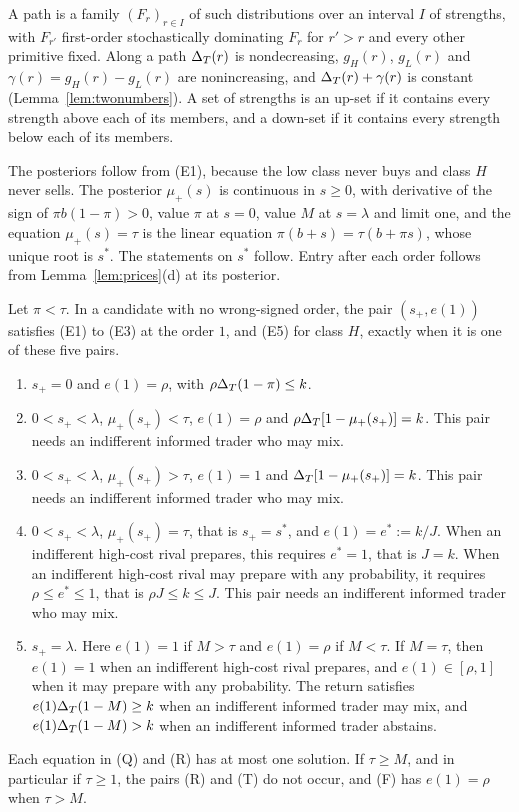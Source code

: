 A path is a family \((F_r)_{r\in I}\) of such distributions over an interval \(I\) of strengths, with \(F_{r'}\) first-order
stochastically dominating \(F_r\) for \(r'>r\) and every other primitive fixed. Along a path \(\Delta_T(r)\) is
nondecreasing, \(g_H(r)\), \(g_L(r)\) and \(\gamma(r)=g_H(r)-g_L(r)\) are nonincreasing, and \(\Delta_T(r)+\gamma(r)\) is
constant (Lemma~\ref{lem:twonumbers}). A set of strengths is an up-set if it contains every strength above each of
its members, and a down-set if it contains every strength below each of its members.

The posteriors follow from (E1), because the low class never buys and class \(H\) never sells. The posterior
\(\mu_+(s)\) is continuous in \(s\ge0\), with derivative of the sign of \(\pi b(1-\pi)>0\), value \(\pi\) at \(s=0\),
value \(M\) at \(s=\lambda\) and limit one, and the equation \(\mu_+(s)=\tau\) is the linear equation
\(\pi(b+s)=\tau(b+\pi s)\), whose unique root is \(s^*\). The statements on \(s^*\) follow. Entry after each order
follows from Lemma~\ref{lem:prices}(d) at its posterior.

\begin{lemma}\label{lem:a4-high}
Let \(\pi<\tau\). In a candidate with no wrong-signed order, the pair \((s_+,e(1))\) satisfies (E1) to (E3) at the
order \(1\), and (E5) for class \(H\), exactly when it is one of these five pairs.
\begin{enumerate}[leftmargin=2.5em]
\item[(N)] \(s_+=0\) and \(e(1)=\rho\), with \(\rho\Delta_T(1-\pi)\le k\).
\item[(Q)] \(0<s_+<\lambda\), \(\mu_+(s_+)<\tau\), \(e(1)=\rho\) and \(\rho\Delta_T[1-\mu_+(s_+)]=k\). This pair needs an
indifferent informed trader who may mix.
\item[(R)] \(0<s_+<\lambda\), \(\mu_+(s_+)>\tau\), \(e(1)=1\) and \(\Delta_T[1-\mu_+(s_+)]=k\). This pair needs an
indifferent informed trader who may mix.
\item[(T)] \(0<s_+<\lambda\), \(\mu_+(s_+)=\tau\), that is \(s_+=s^*\), and \(e(1)=e^*:=k/J\). When an indifferent
high-cost rival prepares, this requires \(e^*=1\), that is \(J=k\). When an indifferent high-cost rival
may prepare with any probability, it requires \(\rho\le e^*\le1\), that is \(\rho J\le k\le J\). This pair needs an
indifferent informed trader who may mix.
\item[(F)] \(s_+=\lambda\). Here \(e(1)=1\) if \(M>\tau\) and \(e(1)=\rho\) if \(M<\tau\). If \(M=\tau\), then \(e(1)=1\)
when an indifferent high-cost rival prepares, and \(e(1)\in[\rho,1]\) when it may prepare with any probability.
The return satisfies \(e(1)\Delta_T(1-M)\ge k\) when an indifferent informed trader may mix, and \(e(1)\Delta_T(1-M)>k\) when an
indifferent informed trader abstains.
\end{enumerate}
Each equation in (Q) and (R) has at most one solution. If \(\tau\ge M\), and in particular if \(\tau\ge1\), the pairs
(R) and (T) do not occur, and (F) has \(e(1)=\rho\) when \(\tau>M\).
\end{lemma}

